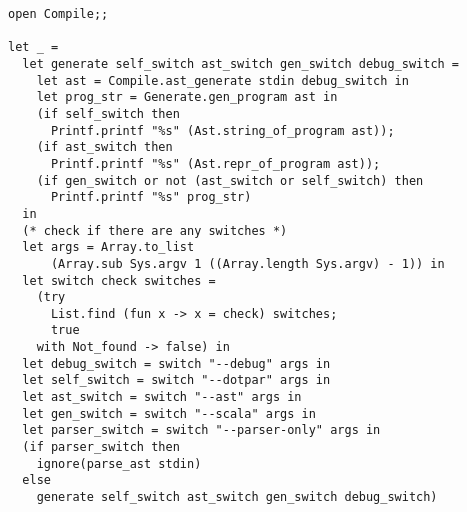 \begin{verbatim}
open Compile;;

let _ =
  let generate self_switch ast_switch gen_switch debug_switch =
    let ast = Compile.ast_generate stdin debug_switch in
    let prog_str = Generate.gen_program ast in
    (if self_switch then
      Printf.printf "%s" (Ast.string_of_program ast));
    (if ast_switch then
      Printf.printf "%s" (Ast.repr_of_program ast));
    (if gen_switch or not (ast_switch or self_switch) then
      Printf.printf "%s" prog_str)
  in
  (* check if there are any switches *)
  let args = Array.to_list
      (Array.sub Sys.argv 1 ((Array.length Sys.argv) - 1)) in
  let switch check switches =
    (try
      List.find (fun x -> x = check) switches;
      true
    with Not_found -> false) in
  let debug_switch = switch "--debug" args in
  let self_switch = switch "--dotpar" args in
  let ast_switch = switch "--ast" args in
  let gen_switch = switch "--scala" args in
  let parser_switch = switch "--parser-only" args in
  (if parser_switch then
    ignore(parse_ast stdin)
  else
    generate self_switch ast_switch gen_switch debug_switch)

\end{verbatim}